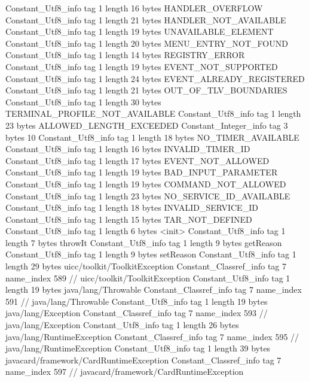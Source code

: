 {{{		}
		Constant_Utf8_info {
			tag	1
			length	16
			bytes	HANDLER_OVERFLOW
		}
		Constant_Utf8_info {
			tag	1
			length	21
			bytes	HANDLER_NOT_AVAILABLE
		}
		Constant_Utf8_info {
			tag	1
			length	19
			bytes	UNAVAILABLE_ELEMENT
		}
		Constant_Utf8_info {
			tag	1
			length	20
			bytes	MENU_ENTRY_NOT_FOUND
		}
		Constant_Utf8_info {
			tag	1
			length	14
			bytes	REGISTRY_ERROR
		}
		Constant_Utf8_info {
			tag	1
			length	19
			bytes	EVENT_NOT_SUPPORTED
		}
		Constant_Utf8_info {
			tag	1
			length	24
			bytes	EVENT_ALREADY_REGISTERED
		}
		Constant_Utf8_info {
			tag	1
			length	21
			bytes	OUT_OF_TLV_BOUNDARIES
		}
		Constant_Utf8_info {
			tag	1
			length	30
			bytes	TERMINAL_PROFILE_NOT_AVAILABLE
		}
		Constant_Utf8_info {
			tag	1
			length	23
			bytes	ALLOWED_LENGTH_EXCEEDED
		}
		Constant_Integer_info {
			tag	3
			bytes	10
		}
		Constant_Utf8_info {
			tag	1
			length	18
			bytes	NO_TIMER_AVAILABLE
		}
		Constant_Utf8_info {
			tag	1
			length	16
			bytes	INVALID_TIMER_ID
		}
		Constant_Utf8_info {
			tag	1
			length	17
			bytes	EVENT_NOT_ALLOWED
		}
		Constant_Utf8_info {
			tag	1
			length	19
			bytes	BAD_INPUT_PARAMETER
		}
		Constant_Utf8_info {
			tag	1
			length	19
			bytes	COMMAND_NOT_ALLOWED
		}
		Constant_Utf8_info {
			tag	1
			length	23
			bytes	NO_SERVICE_ID_AVAILABLE
		}
		Constant_Utf8_info {
			tag	1
			length	18
			bytes	INVALID_SERVICE_ID
		}
		Constant_Utf8_info {
			tag	1
			length	15
			bytes	TAR_NOT_DEFINED
		}
		Constant_Utf8_info {
			tag	1
			length	6
			bytes	<init>
		}
		Constant_Utf8_info {
			tag	1
			length	7
			bytes	throwIt
		}
		Constant_Utf8_info {
			tag	1
			length	9
			bytes	getReason
		}
		Constant_Utf8_info {
			tag	1
			length	9
			bytes	setReason
		}
		Constant_Utf8_info {
			tag	1
			length	29
			bytes	uicc/toolkit/ToolkitException
		}
		Constant_Classref_info {
			tag	7
			name_index	589		// uicc/toolkit/ToolkitException
		}
		Constant_Utf8_info {
			tag	1
			length	19
			bytes	java/lang/Throwable
		}
		Constant_Classref_info {
			tag	7
			name_index	591		// java/lang/Throwable
		}
		Constant_Utf8_info {
			tag	1
			length	19
			bytes	java/lang/Exception
		}
		Constant_Classref_info {
			tag	7
			name_index	593		// java/lang/Exception
		}
		Constant_Utf8_info {
			tag	1
			length	26
			bytes	java/lang/RuntimeException
		}
		Constant_Classref_info {
			tag	7
			name_index	595		// java/lang/RuntimeException
		}
		Constant_Utf8_info {
			tag	1
			length	39
			bytes	javacard/framework/CardRuntimeException
		}
		Constant_Classref_info {
			tag	7
			name_index	597		// javacard/framework/CardRuntimeException
}}}
